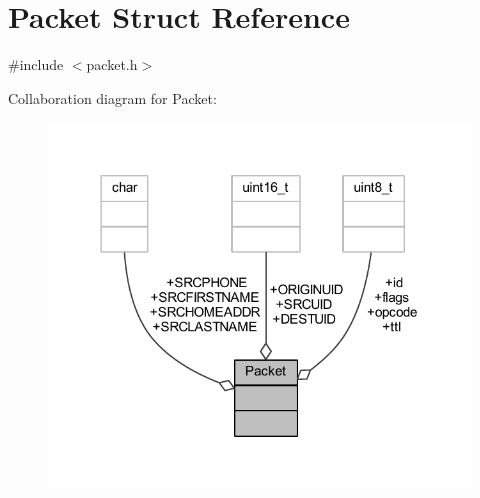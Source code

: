 \hypertarget{struct_packet}{}\section{Packet Struct Reference}
\label{struct_packet}


{\ttfamily \#include $<$packet.\+h$>$}



Collaboration diagram for Packet\+:
\nopagebreak
\begin{figure}[H]
\begin{center}
\leavevmode
\includegraphics[width=318pt]{struct_packet__coll__graph}
\end{center}
\end{figure}
